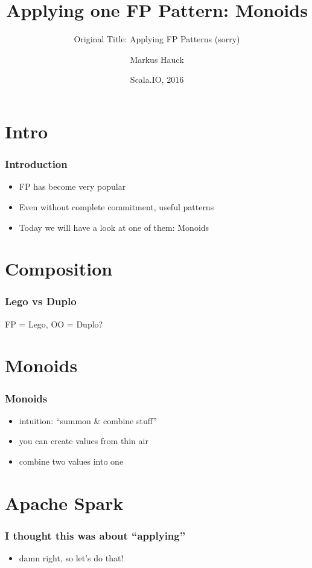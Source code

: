 \documentclass{beamer}
\title{Applying \textbf{one} FP Pattern: Monoids}
\subtitle{Original Title: Applying FP Patterns (sorry)}
\author{Markus Hauck}
\date{Scala.IO, 2016}
\begin{document}
\frame{\titlepage}

\section{Intro}
\label{sec:intro}

\begin{frame}
  \frametitle{Introduction}
  \begin{itemize}
  \item FP has become very popular
  \item Even without complete commitment, useful patterns
  \item Today we will have a look at one of them: Monoids
  \end{itemize}
\end{frame}

\section{Composition}

\begin{frame}
  \frametitle{Lego vs Duplo}
  FP = Lego, OO = Duplo?
\end{frame}

\section{Monoids}

\begin{frame}
  \frametitle{Monoids}
  \begin{itemize}
  \item intuition: ``summon \& combine stuff''
  \item you can create values from thin air
  \item combine two values into one
  \end{itemize}
\end{frame}

\section{Apache Spark}

\begin{frame}
  \frametitle{I thought this was about ``applying''}
  \begin{itemize}
  \item damn right, so let's do that!
  \end{itemize}
\end{frame}
\end{document}
